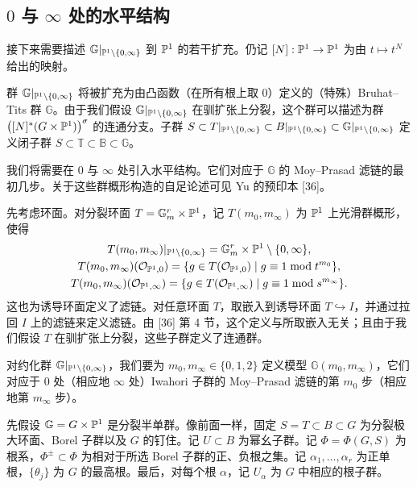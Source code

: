 \subsection{$0$ 与 $\infty$ 处的水平结构}

接下来需要描述 $\mathbb{G}|_{\mathbb{P}^1\setminus\{0,\infty\}}$ 到 $\mathbb{P}^1$ 的若干扩充。仍记 $[N]:\mathbb{P}^1\to\mathbb{P}^1$ 为由 $t\mapsto t^N$ 给出的映射。

群 $\mathbb{G}|_{\mathbb{P}^1\setminus\{0,\infty\}}$ 将被扩充为由凸函数（在所有根上取 $0$）定义的（特殊）Bruhat--Tits 群 $\mathbb{G}$。由于我们假设 $\mathbb{G}|_{\mathbb{P}^1\setminus\{0,\infty\}}$ 在驯扩张上分裂，这个群可以描述为群 $\big([N]^*(G\times\mathbb{P}^1)\big)^\sigma$ 的连通分支。子群 $S\subset T|_{\mathbb{P}^1\setminus\{0,\infty\}}\subset B|_{\mathbb{P}^1\setminus\{0,\infty\}}\subset\mathbb{G}|_{\mathbb{P}^1\setminus\{0,\infty\}}$ 定义闭子群 $S\subset\mathbb{T}\subset\mathbb{B}\subset\mathbb{G}$。

我们将需要在 $0$ 与 $\infty$ 处引入水平结构。它们对应于 $\mathbb{G}$ 的 Moy--Prasad 滤链的最初几步。关于这些群概形构造的自足论述可见 Yu 的预印本 [36]。

先考虑环面。对分裂环面 $T=\mathbb{G}_m^r\times\mathbb{P}^1$，记 $T(m_0,m_\infty)$ 为 $\mathbb{P}^1$ 上光滑群概形，使得
\begin{gather*}
T(m_0,m_\infty)|_{\mathbb{P}^1\setminus\{0,\infty\}}=\mathbb{G}_m^r\times\mathbb{P}^1\setminus\{0,\infty\},\\
T(m_0,m_\infty)(\mathcal O_{\mathbb{P}^1,0})=\{g\in T(\mathcal O_{\mathbb{P}^1,0})\mid g\equiv1\bmod t^{m_0}\},\\
T(m_0,m_\infty)(\mathcal O_{\mathbb{P}^1,\infty})=\{g\in T(\mathcal O_{\mathbb{P}^1,\infty})\mid g\equiv1\bmod s^{m_\infty}\}.
\end{gather*}
这也为诱导环面定义了滤链。对任意环面 $T$，取嵌入到诱导环面 $T\hookrightarrow I$，并通过拉回 $I$ 上的滤链来定义滤链。由 [36] 第 4 节，这个定义与所取嵌入无关；且由于我们假设 $T$ 在驯扩张上分裂，这些子群定义了连通群。

对约化群 $\mathbb{G}|_{\mathbb{P}^1\setminus\{0,\infty\}}$，我们要为 $m_0,m_\infty\in\{0,1,2\}$ 定义模型 $\mathbb{G}(m_0,m_\infty)$，它们对应于 $0$ 处（相应地 $\infty$ 处）Iwahori 子群的 Moy--Prasad 滤链的第 $m_0$ 步（相应地第 $m_\infty$ 步）。

先假设 $\mathbb{G}=G\times\mathbb{P}^1$ 是分裂半单群。像前面一样，固定 $S=T\subset B\subset G$ 为分裂极大环面、Borel 子群以及 $G$ 的钉住。记 $U\subset B$ 为幂幺子群。记 $\Phi=\Phi(G,S)$ 为根系，$\Phi^\pm\subset\Phi$ 为相对于所选 Borel 子群的正、负根之集。记 $\alpha_1,\dots,\alpha_r$ 为正单根，$\{\theta_j\}$ 为 $G$ 的最高根。最后，对每个根 $\alpha$，记 $U_\alpha$ 为 $G$ 中相应的根子群。

